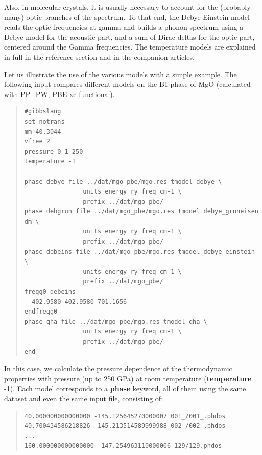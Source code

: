 \documentclass[a4paper]{article}
\begin{document}
Also, in molecular crystals, it is usually necessary to account for
the (probably many) optic branches of the spectrum. To that end, the
Debye-Einstein model reads the optic frequencies at gamma and builds a
phonon spectrum using a Debye model for the acoustic part, and a sum
of Dirac deltas for the optic part, centered around the Gamma
frequencies. The temperature models are explained in full in the
reference section and in the companion articles.

Let us illustrate the use of the various models with a simple
example. The following input compares different models on the B1 phase
of MgO (calculated with PP+PW, PBE xc functional).

\begin{quote}
\begin{verbatim}
#gibbslang
set notrans
mm 40.3044
vfree 2
pressure 0 1 250
temperature -1

phase debye file ../dat/mgo_pbe/mgo.res tmodel debye \
                units energy ry freq cm-1 \
                prefix ../dat/mgo_pbe/
phase debgrun file ../dat/mgo_pbe/mgo.res tmodel debye_gruneisen dm \
                units energy ry freq cm-1 \
                prefix ../dat/mgo_pbe/
phase debeins file ../dat/mgo_pbe/mgo.res tmodel debye_einstein \
                units energy ry freq cm-1 \
                prefix ../dat/mgo_pbe/
freqg0 debeins
  402.9580 402.9580 701.1656
endfreqg0
phase qha file ../dat/mgo_pbe/mgo.res tmodel qha \
                units energy ry freq cm-1 \
                prefix ../dat/mgo_pbe/
end
\end{verbatim}
\end{quote}

In this case, we calculate the pressure dependence of the
thermodynamic properties with pressure (up to 250 GPa) at room
temperature (\textbf{temperature} -1). Each model corresponds to a
\textbf{phase} keyword, all of them using the same dataset and even the
same input file, consisting of:

\begin{quote}
\begin{verbatim}
40.000000000000000 -145.125645270000007 001_/001_.phdos
40.700434586218826 -145.213514589999988 002_/002_.phdos
...
160.000000000000000 -147.254963110000006 129/129.phdos
\end{verbatim}
\end{quote}
\end{document}
